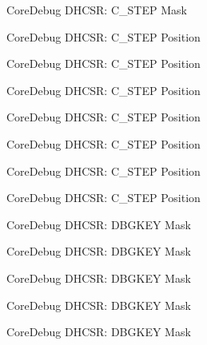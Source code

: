 \begin{DoxyRefList}
\label{deprecated__deprecated000487}%
%
Core\+Debug D\+H\+C\+SR\+: C\+\_\+\+S\+T\+EP Mask  
\item[Member \mbox{\hyperlink{group__CMSIS__CoreDebug_gae1fc39e80de54c0339cbb1b298a9f0f9}{Core\+Debug\+\_\+\+D\+H\+C\+S\+R\+\_\+\+C\+\_\+\+S\+T\+E\+P\+\_\+\+Pos}} ]\label{deprecated__deprecated000035}%
%
Core\+Debug D\+H\+C\+SR\+: C\+\_\+\+S\+T\+EP Position 

\label{deprecated__deprecated000123}%
%
Core\+Debug D\+H\+C\+SR\+: C\+\_\+\+S\+T\+EP Position 

\label{deprecated__deprecated000179}%
%
Core\+Debug D\+H\+C\+SR\+: C\+\_\+\+S\+T\+EP Position 

\label{deprecated__deprecated000262}%
%
Core\+Debug D\+H\+C\+SR\+: C\+\_\+\+S\+T\+EP Position 

\label{deprecated__deprecated000321}%
%
Core\+Debug D\+H\+C\+SR\+: C\+\_\+\+S\+T\+EP Position 

\label{deprecated__deprecated000397}%
%
Core\+Debug D\+H\+C\+SR\+: C\+\_\+\+S\+T\+EP Position 

\label{deprecated__deprecated000486}%
%
Core\+Debug D\+H\+C\+SR\+: C\+\_\+\+S\+T\+EP Position  
\item[Member \mbox{\hyperlink{group__CMSIS__CoreDebug_ga1ce997cee15edaafe4aed77751816ffc}{Core\+Debug\+\_\+\+D\+H\+C\+S\+R\+\_\+\+D\+B\+G\+K\+E\+Y\+\_\+\+Msk}} ]\label{deprecated__deprecated000006}%
%
Core\+Debug D\+H\+C\+SR\+: D\+B\+G\+K\+EY Mask 

\label{deprecated__deprecated000106}%
%
Core\+Debug D\+H\+C\+SR\+: D\+B\+G\+K\+EY Mask 

\label{deprecated__deprecated000160}%
%
Core\+Debug D\+H\+C\+SR\+: D\+B\+G\+K\+EY Mask 

\label{deprecated__deprecated000245}%
%
Core\+Debug D\+H\+C\+SR\+: D\+B\+G\+K\+EY Mask 

\label{deprecated__deprecated000302}%
%
Core\+Debug D\+H\+C\+SR\+: D\+B\+G\+K\+EY Mask 


\end{DoxyRefList}
